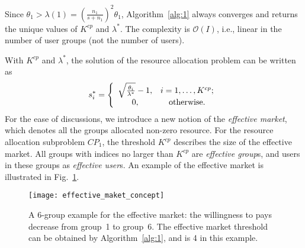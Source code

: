 \documentclass[twocolumn,10pt,twosided]{IEEEtran}
\begin{document}
Since $\theta_1>\lambda(1)=(\frac{n_1}{s+n_1})^2\theta_1$, Algorithm~\ref{alg:1} always converges and returns the unique values of $K^{cp}$ and $\lambda^{\ast}$. The complexity is $\mathcal{O}(I)$, i.e., linear in the number of user groups (not the number of users).

With $K^{cp}$ and $\lambda^*$, the solution of the resource allocation problem can be written as
\begin{equation}
\label{cp_resource_solution}
    s^*_i= \left\{{\begin{array}{cc}
  \sqrt{\frac{\theta_i}{\lambda^*}}-1, & i=1,\dots,K^{cp};\\
  0, & {\rm{otherwise}}.  \\
\end{array}} \right.
\end{equation}
For the ease of discussions, we introduce a new notion of the \emph{effective market}, which denotes all the groups allocated non-zero resource. For the resource allocation subproblem $CP_1$, the threshold $K^{cp}$ describes the size of the effective market. All groups with indices no larger than $K^{cp}$ are \emph{effective group}s, and users in these groups as \emph{effective user}s. An example of the effective market is illustrated in Fig.~\ref{fig:effective_market_concept}.
\begin{figure}[hbt]
\centering
  \texttt{[image: effective\_maket\_concept]}
  \caption{A 6-group example for the effective market:  the willingness to pays decrease from group~1 to group~6. The effective market threshold can be obtained by Algorithm~\ref{alg:1}, and is 4 in this example.}
  \label{fig:effective_market_concept}
\end{figure}
\end{document}
